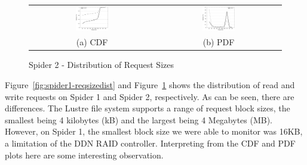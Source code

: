 \begin{figure}[!t]
\begin{center}
\begin{tabular}{cc}
\hspace*{-1cm}                                                           
{\includegraphics[width=0.27\textwidth]{./figs/spider2-reqSizeCDF.eps}}&
\hspace{-2mm}
{\includegraphics[width=0.27\textwidth]{./figs/spider2-reqSizePDF.eps}}\\
\small (a) CDF & \small(b) PDF \\
\end{tabular}
\vspace{-0.1in}
\caption{Spider 2 - Distribution of Request Sizes}
\label{fig:spider2-reqsizedist}
\end{center}
\end{figure}

Figure~\ref{fig:spider1-reqsizedist} and Figure~\ref{fig:spider2-reqsizedist}
shows the distribution of read and write requests on Spider 1 and Spider 2,
respectively. As can be seen, there are differences. The Lustre file system
supports a range of request block sizes, the smallest being 4 kilobytes (kB)
and the largest being 4 Megabytes (MB).  However, on Spider 1, the smallest
block size we were able to monitor was 16KB, a limitation of the DDN RAID
controller. Interpreting from the CDF and PDF plots here are some interesting
observation.

